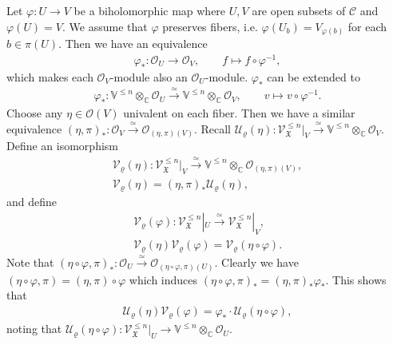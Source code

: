 \documentclass[12pt,a4paper,notitlepage]{report}
\theoremstyle{definition}
\theoremstyle{plain}
\newcommand{\fk}{\mathfrak}
\newcommand{\mc}{\mathcal}
\newcommand{\scr}{\mathscr}
\newcommand{\Vbb}{\mathbb V}
\newcommand{\Cbb}{\mathbb C}
\numberwithin{equation}{section}
\begin{document}
Let $\varphi:U\rightarrow V$ be a biholomorphic map where $U,V$ are open subsets of $\mc C$ and $\varphi(U)=V$. We assume that $\varphi$ preserves fibers, i.e. $\varphi(U_b)=V_{\varphi(b)}$ for each $b\in\pi(U)$. Then we have an  equivalence
\begin{gather*}
\varphi_*:\scr O_U\rightarrow\scr O_V,\qquad f\mapsto f\circ\varphi^{-1},
\end{gather*}
which makes each $\scr O_V$-module also an $\scr O_U$-module. $\varphi_*$ can be extended to
\begin{gather*}
\varphi_*:\Vbb^{\leq n}\otimes_{\Cbb}\scr O_U\xrightarrow{\simeq}\Vbb^{\leq n}\otimes_{\Cbb}\scr O_V,\qquad v\mapsto v\circ\varphi^{-1}.
\end{gather*}
Choose any $\eta\in\scr O(V)$ univalent on each fiber. Then we have a similar equivalence $(\eta,\pi)_*:\scr O_V\xrightarrow{\simeq}\scr O_{(\eta,\pi)(V)}$. Recall $\mc U_\varrho(\eta):\scr V_{\fk X}^{\leq n}|_V\xrightarrow{\simeq}\Vbb^{\leq n}\otimes_{\Cbb}\scr O_V$. Define an isomorphism
\begin{gather}
\mc V_\varrho(\eta):\scr V_{\fk X}^{\leq n}|_V\xrightarrow{\simeq}\Vbb^{\leq n}\otimes_{\Cbb}\scr O_{(\eta,\pi)(V)},\nonumber\\
\mc V_\varrho(\eta)=(\eta,\pi)_*\mc U_\varrho(\eta),
\end{gather}
and define \index{UV@$\mc U_\varrho(\eta),\mc U_\varrho(\varphi),\mc V_\varrho(\eta),\mc V_\varrho(\varphi)$}
\begin{gather}
\mc V_\varrho(\varphi):\scr V_{\fk X}^{\leq n}|_U\xrightarrow{\simeq} \scr V_{\fk X}^{\leq n}|_V,\nonumber\\
\mc V_\varrho(\eta)\mc V_\varrho(\varphi)=\mc V_\varrho(\eta\circ\varphi).\label{eq93}
\end{gather}
Note that $(\eta\circ\varphi,\pi)_*:\scr O_U\xrightarrow{\simeq}\scr O_{(\eta\circ\varphi,\pi)(U)}$. Clearly we have $(\eta\circ\varphi,\pi)=(\eta,\pi)\circ\varphi$ which induces $(\eta\circ\varphi,\pi)_*=(\eta,\pi)_*\varphi_*$. This shows that
\begin{gather}
\mc U_\varrho(\eta)\mc V_\varrho(\varphi)=\varphi_*\cdot \mc U_\varrho(\eta\circ\varphi),\label{eq86}
\end{gather}
noting that $\mc U_\varrho(\eta\circ\varphi):\scr V_{\fk X}^{\leq n}|_U\rightarrow\Vbb^{\leq n}\otimes_{\Cbb}\scr O_U$. 
\end{document}
